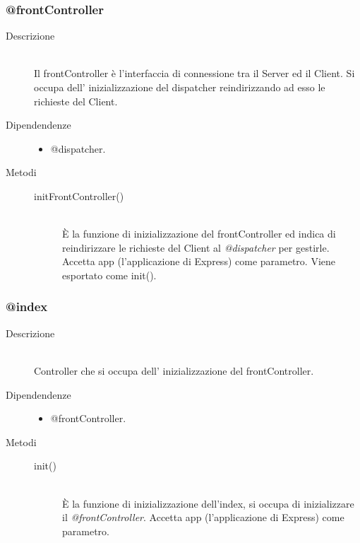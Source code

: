 \subsubsection{@frontController}
\begin{description}
 \item[Descrizione] \hfill \\
 Il frontController è l'interfaccia di connessione tra il Server ed il Client. Si occupa dell' inizializzazione del dispatcher reindirizzando ad esso le richieste del Client.
 \item[Dipendendenze] \hfill
 \begin{itemize}
 \item @dispatcher.
 \end{itemize}
 \item[Metodi] \hfill
  \begin{description}
    \item[initFrontController()] \hfill \\
  	\`{E} la funzione di inizializzazione del frontController ed indica di reindirizzare le richieste del Client al \textit{@dispatcher} per gestirle. Accetta  app (l'applicazione di Express) come parametro. Viene esportato come init().
  \end{description}
\end{description}

\subsubsection{@index}
\begin{description}
 \item[Descrizione] \hfill \\
  Controller che si occupa dell' inizializzazione del frontController.
 \item[Dipendendenze] \hfill
 \begin{itemize}
 \item @frontController.
 \end{itemize}
 \item[Metodi] \hfill
  \begin{description}
    \item[init()]\hfill \\
  	\`{E} la funzione di inizializzazione dell'index, si occupa di inizializzare il \textit{@frontController}. Accetta  app (l'applicazione di Express) come parametro.
  \end{description}
\end{description}

